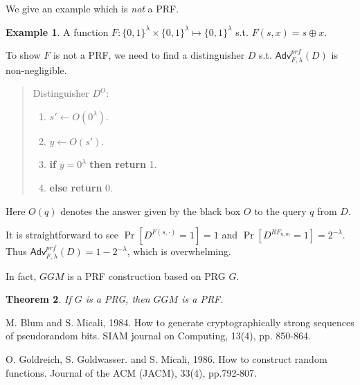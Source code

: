 \documentclass[12pt]{article}
\newcommand{\bits}{\{0,1\}}
\newcommand{\Adv}{\mathsf{Adv}}
\newtheorem{theorem}{Theorem}[section]
\theoremstyle{definition}
\newtheorem{example}[theorem]{Example}
\begin{document}
We give an example which is \emph{not} a PRF.
\begin{example}
A function $F : \bits^\lambda \times \bits^\lambda \mapsto \bits^{\lambda}$ s.t. $F(s,x) = s \oplus x$.

To show $F$ is not a PRF, we need to find a distinguisher $D$ s.t. $\Adv_{F,\lambda}^{prf}(D)$ is non-negligible.
\begin{quote}
Distinguisher $D^O$:
\begin{enumerate}
\item $s' \gets O(0^\lambda)$.
\item $y \gets O(s')$.
\item {\bf if} $y=0^\lambda$ {\bf then return} 1.
\item {\bf else return} 0.
\end{enumerate}
\end{quote}
Here $O(q)$ denotes the answer given by the black box $O$ to the query $q$ from $D$.

It is straightforward to see $\Pr[D^{F(s,\cdot)}=1]=1$ and $\Pr[D^{RF_{n,m}}=1]=2^{-\lambda}$. Thus $\Adv_{F,\lambda}^{prf}(D)=1-2^{-\lambda}$, which is overwhelming.
\end{example}

In fact, $GGM$ is a PRF construction based on PRG $G$.
\begin{theorem}
If $G$ is a PRG, then $GGM$ is a PRF.
\end{theorem}

\begin{thebibliography}{10}

M. Blum and S. Micali, 1984. 
How to generate cryptographically strong sequences of pseudorandom bits. 
SIAM journal on Computing, 13(4), pp. 850-864.

O. Goldreich, S. Goldwasser. and S. Micali, 1986. 
How to construct random functions. 
Journal of the ACM (JACM), 33(4), pp.792-807.

\end{thebibliography}
\end{document}
